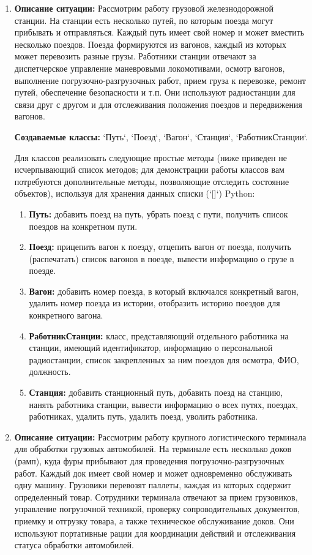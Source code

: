 \begin{enumerate}

\item
\textbf{Описание ситуации:}
Рассмотрим работу грузовой железнодорожной станции. На станции есть несколько путей, по которым поезда могут прибывать и отправляться. Каждый путь имеет свой номер и может вместить несколько поездов. Поезда формируются из вагонов, каждый из которых может перевозить разные грузы. Работники станции отвечают за диспетчерское управление маневровыми локомотивами, осмотр вагонов, выполнение погрузочно-разгрузочных работ, прием груза к перевозке, ремонт путей, обеспечение безопасности и т.п. Они используют радиостанции для связи друг с другом и для отслеживания положения поездов и передвижения вагонов.

\textbf{Создаваемые классы:} `Путь`, `Поезд`, `Вагон`, `Станция`, `РаботникСтанции`.

Для классов реализовать следующие простые методы (ниже приведен не исчерпывающий список методов; для демонстрации работы классов вам потребуются дополнительные методы, позволяющие отследить состояние объектов), используя для хранения данных списки (`[]`) Python:
\begin{enumerate}
    \item \textbf{Путь:} добавить поезд на путь, убрать поезд с пути, получить список поездов на конкретном пути.
    \item \textbf{Поезд:} прицепить вагон к поезду, отцепить вагон от поезда, получить (распечатать) список вагонов в поезде, вывести информацию о грузе в поезде.
    \item \textbf{Вагон:} добавить номер поезда, в который включался конкретный вагон, удалить номер поезда из истории, отобразить историю поездов для конкретного вагона.
    \item \textbf{РаботникСтанции:} класс, представляющий отдельного работника на станции, имеющий идентификатор, информацию о персональной радиостанции, список закрепленных за ним поездов для осмотра, ФИО, должность.
    \item \textbf{Станция:} добавить станционный путь, добавить поезд на станцию, нанять работника станции, вывести информацию о всех путях, поездах, работниках, удалить путь, удалить поезд, уволить работника.
\end{enumerate}

\item
\textbf{Описание ситуации:}
Рассмотрим работу крупного логистического терминала для обработки грузовых автомобилей. На терминале есть несколько доков (рамп), куда фуры прибывают для проведения погрузочно-разгрузочных работ. Каждый док имеет свой номер и может одновременно обслуживать одну машину. Грузовики перевозят паллеты, каждая из которых содержит определенный товар. Сотрудники терминала отвечают за прием грузовиков, управление погрузочной техникой, проверку сопроводительных документов, приемку и отгрузку товара, а также техническое обслуживание доков. Они используют портативные рации для координации действий и отслеживания статуса обработки автомобилей.


\end{enumerate}
